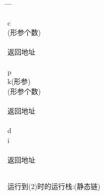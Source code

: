 \documentclass{article}
\begin{document}
\begin{tabbing}
    \hspace{1.5cm} \= \hspace{1.5cm} \= \hspace{1.5cm} \= \kill

     \> c\\

     (形参个数)\\

     \\

     \> 返回地址\\

     \\

     \> p\\

     \> k(形参)\\

     (形参个数)\\

     \\

     \> 返回地址\\

     \\

     \> d \\

     \> i\\

     \\

     \> 返回地址\\

     \\

\end{tabbing}

运行到(2)时的运行栈:(静态链)
\end{document}
